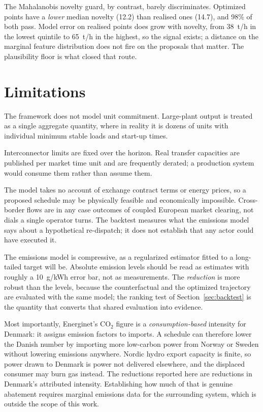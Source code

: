 \documentclass[11pt]{article}
\begin{document}
The Mahalanobis novelty guard, by contrast, barely discriminates.
Optimized points have a \emph{lower} median novelty (12.2) than realised
ones (14.7), and 98\% of both pass. Model error on realised points does
grow with novelty, from 38~t/h in the lowest quintile to 65~t/h in the
highest, so the signal exists; a distance on the marginal feature
distribution does not fire on the proposals that matter. The
plausibility floor is what closed that route.

\section{Limitations}

The framework does not model unit commitment. Large-plant output is
treated as a single aggregate quantity, where in reality it is dozens of
units with individual minimum stable loads and start-up times.

Interconnector limits are fixed over the horizon. Real transfer
capacities are published per market time unit and are frequently derated;
a production system would consume them rather than assume them.

The model takes no account of exchange contract terms or energy prices,
so a proposed schedule may be physically feasible and economically
impossible. Cross-border flows are in any case outcomes of coupled
European market clearing, not dials a single operator turns. The
backtest measures what the emissions model says about a hypothetical
re-dispatch; it does not establish that any actor could have executed
it.

The emissions model is compressive, as a regularized estimator fitted to
a long-tailed target will be. Absolute emission levels should be read as
estimates with roughly a 10~g/kWh error bar, not as measurements. The
\emph{reduction} is more robust than the levels, because the
counterfactual and the optimized trajectory are evaluated with the same
model; the ranking test of Section~\ref{sec:backtest} is the quantity
that converts that shared evaluation into evidence.

Most importantly, Energinet's CO$_2$ figure is a \emph{consumption-based}
intensity for Denmark: it assigns emission factors to imports. A schedule
can therefore lower the Danish number by importing more low-carbon power
from Norway or Sweden without lowering emissions anywhere. Nordic hydro
export capacity is finite, so power drawn to Denmark is power not
delivered elsewhere, and the displaced consumer may burn gas instead. The
reductions reported here are reductions in Denmark's attributed
intensity. Establishing how much of that is genuine abatement requires
marginal emissions data for the surrounding system, which is outside the
scope of this work.
\end{document}
